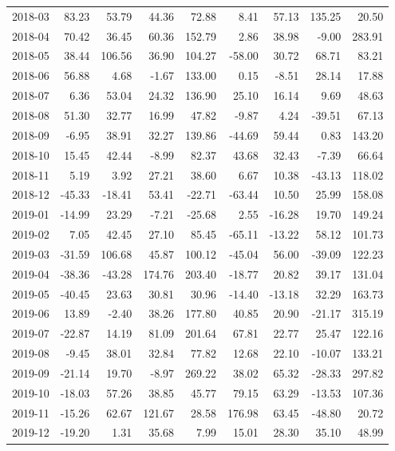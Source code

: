 \begin{table}[ht]
\begin{tabular}{lrrrrrrrr}
  2018-03 & 83.23 & 53.79 & 44.36 & 72.88 & 8.41 & 57.13 & 135.25 & 20.50 \\ 
  2018-04 & 70.42 & 36.45 & 60.36 & 152.79 & 2.86 & 38.98 & -9.00 & 283.91 \\ 
  2018-05 & 38.44 & 106.56 & 36.90 & 104.27 & -58.00 & 30.72 & 68.71 & 83.21 \\ 
  2018-06 & 56.88 & 4.68 & -1.67 & 133.00 & 0.15 & -8.51 & 28.14 & 17.88 \\ 
  2018-07 & 6.36 & 53.04 & 24.32 & 136.90 & 25.10 & 16.14 & 9.69 & 48.63 \\ 
  2018-08 & 51.30 & 32.77 & 16.99 & 47.82 & -9.87 & 4.24 & -39.51 & 67.13 \\ 
  2018-09 & -6.95 & 38.91 & 32.27 & 139.86 & -44.69 & 59.44 & 0.83 & 143.20 \\ 
  2018-10 & 15.45 & 42.44 & -8.99 & 82.37 & 43.68 & 32.43 & -7.39 & 66.64 \\ 
  2018-11 & 5.19 & 3.92 & 27.21 & 38.60 & 6.67 & 10.38 & -43.13 & 118.02 \\ 
  2018-12 & -45.33 & -18.41 & 53.41 & -22.71 & -63.44 & 10.50 & 25.99 & 158.08 \\ 
  2019-01 & -14.99 & 23.29 & -7.21 & -25.68 & 2.55 & -16.28 & 19.70 & 149.24 \\ 
  2019-02 & 7.05 & 42.45 & 27.10 & 85.45 & -65.11 & -13.22 & 58.12 & 101.73 \\ 
  2019-03 & -31.59 & 106.68 & 45.87 & 100.12 & -45.04 & 56.00 & -39.09 & 122.23 \\ 
  2019-04 & -38.36 & -43.28 & 174.76 & 203.40 & -18.77 & 20.82 & 39.17 & 131.04 \\ 
  2019-05 & -40.45 & 23.63 & 30.81 & 30.96 & -14.40 & -13.18 & 32.29 & 163.73 \\ 
  2019-06 & 13.89 & -2.40 & 38.26 & 177.80 & 40.85 & 20.90 & -21.17 & 315.19 \\ 
  2019-07 & -22.87 & 14.19 & 81.09 & 201.64 & 67.81 & 22.77 & 25.47 & 122.16 \\ 
  2019-08 & -9.45 & 38.01 & 32.84 & 77.82 & 12.68 & 22.10 & -10.07 & 133.21 \\ 
  2019-09 & -21.14 & 19.70 & -8.97 & 269.22 & 38.02 & 65.32 & -28.33 & 297.82 \\ 
  2019-10 & -18.03 & 57.26 & 38.85 & 45.77 & 79.15 & 63.29 & -13.53 & 107.36 \\ 
  2019-11 & -15.26 & 62.67 & 121.67 & 28.58 & 176.98 & 63.45 & -48.80 & 20.72 \\ 
  2019-12 & -19.20 & 1.31 & 35.68 & 7.99 & 15.01 & 28.30 & 35.10 & 48.99 \\ 

\end{tabular}
\end{table}
